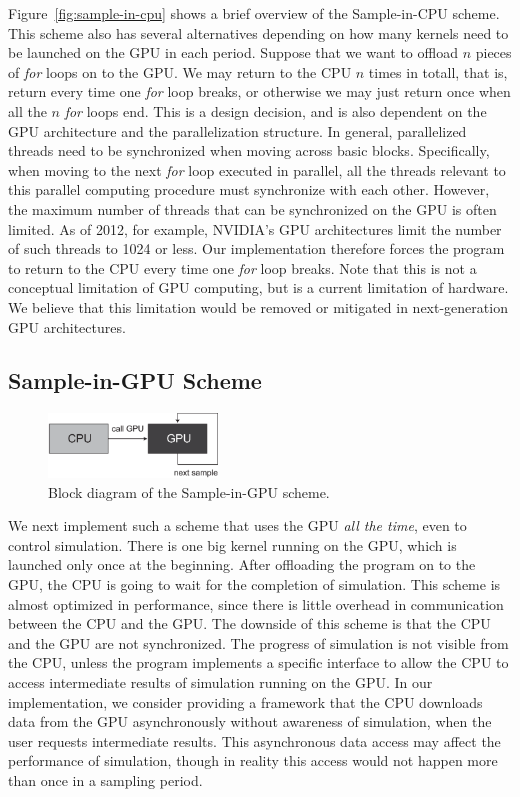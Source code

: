 \documentclass[times, 10pt, twocolumn]{article}
\begin{document}
Figure~\ref{fig:sample-in-cpu} shows a brief overview of the
Sample-in-CPU scheme.
This scheme also has several alternatives depending on how many kernels
need to be launched on the GPU in each period. 
Suppose that we want to offload $n$ pieces of \textit{for} loops on to
the GPU.
We may return to the CPU $n$ times in totall, that is, return every time
one \textit{for} loop breaks, or otherwise we may just return once when
all the $n$ \textit{for} loops end.
This is a design decision, and is also dependent on the GPU architecture
and the parallelization structure.
In general, parallelized threads need to be synchronized when moving
across basic blocks.
Specifically, when moving to the next \textit{for} loop executed in
parallel, all the threads relevant to this parallel computing procedure
must synchronize with each other.
However, the maximum number of threads that can be synchronized on the
GPU is often limited.
As of 2012, for example, NVIDIA's GPU architectures limit the number of
such threads to 1024 or less.
Our implementation therefore forces the program to return to the CPU
every time one \textit{for} loop breaks.
Note that this is not a conceptual limitation of GPU computing, but is a
current limitation of hardware.
We believe that this limitation would be removed or mitigated in
next-generation GPU architectures.

\subsection{Sample-in-GPU Scheme}
\label{sec:sample-in-gpu}

\begin{figure}[t]
\centering
\includegraphics[width=0.4\textwidth]{eps/sample-in-gpu.eps}
\caption{Block diagram of the Sample-in-GPU scheme.}
\label{fig:sample-in-gpu}
\end{figure}

We next implement such a scheme that uses the GPU \textit{all the time},
even to control simulation.
There is one big kernel running on the GPU, which is launched only once
at the beginning.
After offloading the program on to the GPU, the CPU is going to wait for
the completion of simulation.
This scheme is almost optimized in performance, since there is little
overhead in communication between the CPU and the GPU.
The downside of this scheme is that the CPU and the GPU are not
synchronized.
The progress of simulation is not visible from the CPU, unless the
program implements a specific interface to allow the CPU to access
intermediate results of simulation running on the GPU.
In our implementation, we consider providing a framework that the CPU
downloads data from the GPU asynchronously without awareness of
simulation, when the user requests intermediate results.
This asynchronous data access may affect the performance of simulation,
though in reality this access would not happen more than once in a
sampling period.
\end{document}
